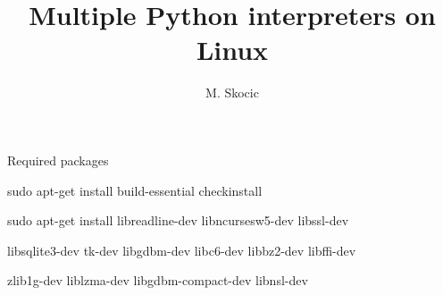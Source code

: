 \documentclass[10pt,compress]{beamer}
\title{Multiple Python interpreters on Linux}
\author{M. Skocic}
\begin{document}
\begin{frame}
    \titlepage
\end{frame}

\begin{frame}{Required packages}

    sudo apt-get install build-essential checkinstall

    sudo apt-get install libreadline-dev libncursesw5-dev libssl-dev 

    libsqlite3-dev tk-dev libgdbm-dev libc6-dev libbz2-dev libffi-dev

    zlib1g-dev liblzma-dev libgdbm-compact-dev libnsl-dev

\end{frame}
\end{document}
